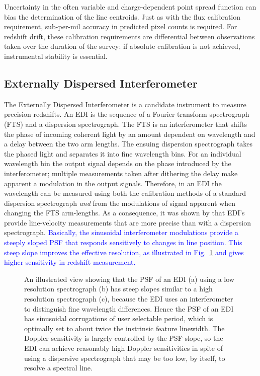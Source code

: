 \documentclass[preprint2, 10pt]{aastex}
\begin{document}
Uncertainty in the often variable and charge-dependent point spread function can
bias the determination of the line centroids.  Just as with the flux calibration requirement, sub-per-mil accuracy in predicted pixel counts
is required.  For redshift drift, these calibration requirements are differential between observations taken
over the duration of the survey: if absolute calibration is not achieved, instrumental stability is essential.


\subsection{Externally Dispersed Interferometer} 

The Externally Dispersed Interferometer \citep[EDI;][]{2003PASP..115..255E} is a candidate instrument to measure precision redshifts. 
An EDI is the sequence of a Fourier transform spectrograph (FTS) and a dispersion spectrograph.  The FTS is an interferometer that shifts
the phase of incoming coherent light
by an amount dependent on wavelength and a  delay between the two arm lengths.
The ensuing dispersion spectrograph takes the phased light and separates it into fine wavelength bins.
For an individual wavelength bin the output signal depends on the phase introduced by the interferometer; multiple
measurements taken after dithering the delay  make apparent a modulation in the output signals.
Therefore, in an EDI the wavelength can be measured using both the calibration methods of a standard dispersion
spectrograph {\it and\/} from the modulations of signal apparent when changing the FTS arm-lengths.   As a consequence,
it was shown by
\citet{2003PASP..115..255E} that EDI's provide line-velocity measurements that are more precise than with a dispersion spectrograph. 
\textcolor{blue}{Basically, the sinusoidal interferometer modulations 
provide a steeply sloped PSF that responds sensitively to changes in 
line position. This steep slope improves the effective resolution, as 
illustrated in Fig.~\ref{fig:edipsf} and gives 
higher sensitivity in redshift measurement.} 


\begin{figure}[t]
   \centering
   \caption{An illustrated view showing that 
the PSF of an EDI (a) using a low resolution spectrograph (b) has steep slopes similar to a high resolution spectrograph (c), because the EDI uses an interferometer to distinguish fine wavelength differences.  Hence the PSF of an EDI has sinusoidal corrugations of user selectable period, which is optimally set to about twice the instrinsic feature linewidth.  The Doppler sensitivity is largely controlled by the PSF slope, so the EDI can achieve reasonably high Doppler sensitivities in spite of using a dispersive spectrograph that may be too low, by itself, to resolve a spectral line. 
\label{fig:edipsf}}
\end{figure}
\end{document}
